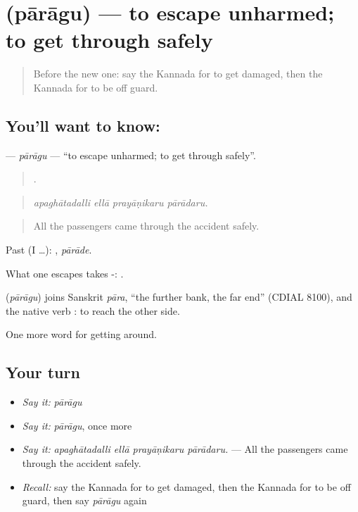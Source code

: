 \section[\texorpdfstring{\kn{ಪಾರಾಗು} (pārāgu)}{ಪಾರಾಗು (pārāgu)}]{ (pārāgu) — to escape unharmed; to get through safely}

\label{lesson:KA-C472-paragu}



\begin{quote}
Before the new one: say the Kannada for to get damaged, then the Kannada for to be off guard.
\end{quote}

\subsection*{You'll want to know: }
\textbf{} — \emph{pārāgu} — \textquotedblleft{}to escape unharmed; to get through safely\textquotedblright{}.

\begin{quote}
   .
\end{quote}

\begin{quote}
\emph{apaghātadalli ellā prayāṇikaru pārādaru.}
\end{quote}

\begin{quote}
All the passengers came through the accident safely.
\end{quote}

Past (I …): , \emph{pārāde}.

What one escapes takes -:  .

\begin{cousinweb}
\textbf{} (\emph{pārāgu}) joins Sanskrit \emph{pāra}, \textquotedblleft{}the further bank, the far end\textquotedblright{} (CDIAL 8100), and the native verb : to reach the other side.
\end{cousinweb}

\begin{grammarlens}[title={What you've built}]
One more word for getting around.
\end{grammarlens}

\subsection*{Your turn}
\begin{itemize}
\raggedright
  \item \emph{Say it:} \emph{pārāgu}
  \item \emph{Say it:} \emph{pārāgu}, once more
  \item \emph{Say it:} \emph{apaghātadalli ellā prayāṇikaru pārādaru.} — All the passengers came through the accident safely.
  \item \emph{Recall:} say the Kannada for to get damaged, then the Kannada for to be off guard, then say \emph{pārāgu} again
\end{itemize}

